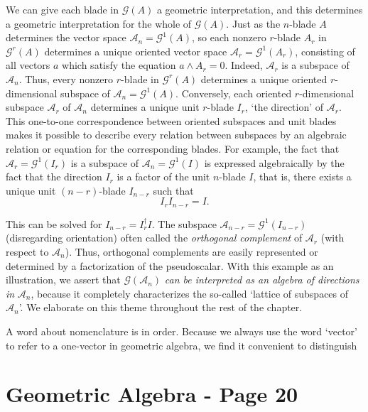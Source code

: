 \documentclass[fleqn]{scrartcl}
\numberwithin{equation}{section}
\begin{document}
\vspace{1em}
\noindent We can give each blade in \(\mathscr{G}(A)\) a geometric interpretation, and this determines a geometric interpretation for the whole of \(\mathscr{G}(A)\). Just as the \(n\)-blade \(A\) determines the vector space \(\mathscr{A}_n = \mathscr{G}^1(A)\), so each nonzero \(r\)-blade \(A_r\) in \(\mathscr{G}^r(A)\) determines a unique oriented vector space \(\mathscr{A}_r = \mathscr{G}^1(A_r)\), consisting of all vectors \(a\) which satisfy the equation \(a \wedge A_r = 0\). Indeed, \(\mathscr{A}_r\) is a subspace of \(\mathscr{A}_n\). Thus, every nonzero \(r\)-blade in \(\mathscr{G}^r(A)\) determines a unique oriented \(r\)-dimensional subspace of \(\mathscr{A}_n = \mathscr{G}^1(A)\). Conversely, each oriented \(r\)-dimensional subspace \(\mathscr{A}_r\) of \(\mathscr{A}_n\) determines a unique unit \(r\)-blade \(I_r\), `the direction' of \(\mathscr{A}_r\). This one-to-one correspondence between oriented subspaces and unit blades makes it possible to describe every relation between subspaces by an algebraic relation or equation for the corresponding blades. For example, the fact that \(\mathscr{A}_r = \mathscr{G}^1(I_r)\) is a subspace of \(\mathscr{A}_n = \mathscr{G}^1(I)\) is expressed algebraically by the fact that the direction \(I_r\) is a factor of the unit \(n\)-blade \(I\), that is, there exists a unique unit \((n-r)\)-blade \(I_{n-r}\) such that
\[
I_r I_{n-r} = I.
\]

\vspace{1em}
\noindent This can be solved for \(I_{n-r} = I_r^{\dagger} I\). The subspace \(\mathscr{A}_{n-r} = \mathscr{G}^1(I_{n-r})\) (disregarding orientation) often called the \textit{orthogonal complement} of \(\mathscr{A}_r\) (with respect to \(\mathscr{A}_n\)). Thus, orthogonal complements are easily represented or determined by a factorization of the pseudoscalar. With this example as an illustration, we assert that \(\mathscr{G}(\mathscr{A}_n)\) \textit{can be interpreted as an algebra of directions in} \(\mathscr{A}_n\), because it completely characterizes the so-called `lattice of subspaces of \(\mathscr{A}_n\)'. We elaborate on this theme throughout the rest of the chapter.

\vspace{1em}
\noindent A word about nomenclature is in order. Because we always use the word `vector' to refer to a one-vector in geometric algebra, we find it convenient to distinguish

\section*{Geometric Algebra - Page 20}
\end{document}
